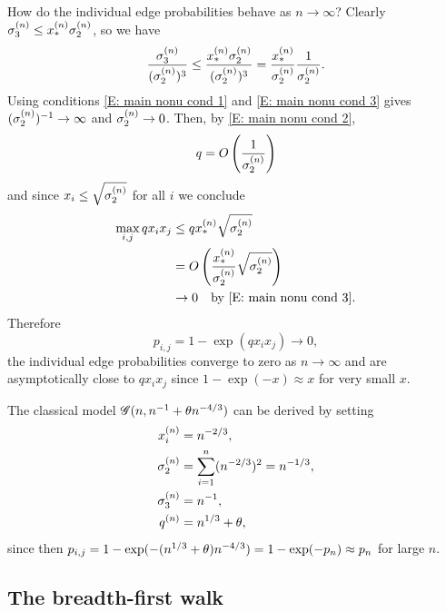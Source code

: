 How do the individual edge probabilities behave as $n \rightarrow \infty$?
Clearly $\sigma^{(n)}_3 \leq x_*^{(n)} \sigma^{(n)}_2$, so we have
\begin{equation}
	\frac{\sigma^{(n)}_3}{(\sigma^{(n)}_2)^3} \leq \frac{x_*^{(n)} \sigma^{(n)}_2}{(\sigma^{(n)}_2)^3} = \frac{x_*^{(n)}}{\sigma^{(n)}_2}\frac{1}{\sigma^{(n)}_2}.
\end{equation}
Using conditions \eqref{E: main nonu cond 1} and \eqref{E: main nonu cond 3} gives
$(\sigma^{(n)}_2)^{-1} \rightarrow \infty$ and $\sigma^{(n)}_2 \rightarrow 0$.
Then, by \eqref{E: main nonu cond 2},
\begin{equation}
	q = O\left(\frac{1}{\sigma^{(n)}_2}\right)
\end{equation}
and since $x_i \leq \sqrt{\sigma^{(n)}_2}$ for all $i$ we conclude
\begin{equation}
	\begin{aligned}
	\max_{i,j} q x_i x_j 
	&\leq q x_*^{(n)} \sqrt{\sigma^{(n)}_2} \\
	&= O\left( \frac{x_*^{(n)}}{\sigma^{(n)}_2} \sqrt{\sigma^{(n)}_2} \right) \\
	&\rightarrow 0 \quad \text{by \eqref{E: main nonu cond 3}}.
	\end{aligned}
\end{equation}
Therefore
\begin{equation}
	p_{i,j} = 1 - \exp(q x_i x_j) \rightarrow 0,
\end{equation}
the individual edge probabilities converge to zero as $n \rightarrow \infty$
and are asymptotically close to $qx_i x_j$ since $1 - \exp(-x) \approx x$ for very small $x$.

The classical model $\mathscr{G}(n, n^{-1} + \theta n^{-4/3})$ can be derived by setting
\begin{equation}
\begin{aligned}
	x_i^{(n)} &= n^{-2 / 3},  \\
	\sigma^{(n)}_2 &= \sum_{i = 1}^{n} (n^{-2 / 3})^2 = n^{-1 / 3}, \\
	\sigma^{(n)}_3 &= n^{-1}, \\
	q^{(n)} &= n^{1 / 3} + \theta,
\end{aligned}
\end{equation}
since then $p_{i,j} = 1 - \exp(-(n^{1 / 3} + \theta)n^{-4 / 3}) = 1 - \exp(-p_n) \approx p_n$ for large $n$.


\subsection{The breadth-first walk}

